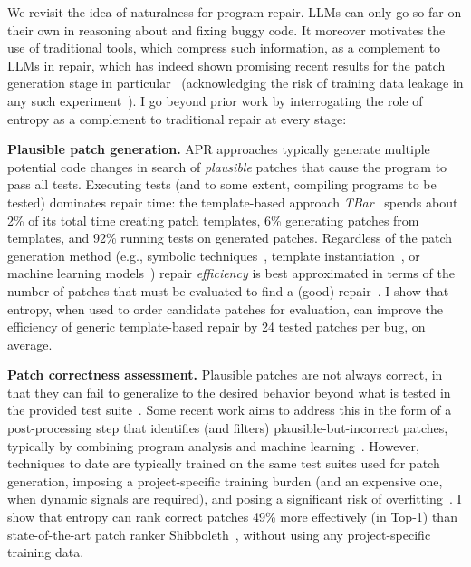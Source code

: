 \documentclass[12pt,openany,oneside,table]{cmuthesis}
\begin{document}
We revisit the idea of naturalness for program repair. 
LLMs can only go so far on their own in reasoning about and
fixing buggy code. It moreover motivates the use of traditional tools, which
compress such information, as a complement to LLMs in repair, which has indeed
shown promising recent results for the patch generation stage in
particular~\cite{xia2023automated} (acknowledging the risk of training data
leakage in any such experiment~\cite{balloccu2024leak}). 
I go beyond prior work by interrogating the role of entropy as a complement to
traditional repair at every stage:

\noindent\textbf{Plausible patch generation.} APR approaches
typically generate multiple potential code changes in search of 
\emph{plausible} patches that cause the program to pass all tests.
Executing tests (and to some extent, compiling programs to be tested) dominates
repair time: the template-based approach \textit{TBar}~\cite{TBar} spends about 2\% of
its total time creating patch templates, 6\% generating patches from templates,
and 92\% running tests on generated patches. Regardless of the patch generation method (e.g.,
symbolic techniques~\cite{patch-sim, claire_apr,angelix}, template instantiation~\cite{TBar, kim2022multi}, or
machine learning models~\cite{xia2023automated}) repair \emph{efficiency} is best
approximated in terms of the number of patches that must be evaluated to find a
(good) repair~\cite{efficiency}.
I show that entropy, when used to order candidate patches for evaluation, can
improve the efficiency of generic template-based repair by 24
tested patches per bug, on average.

\vspace{1ex} 
\noindent\textbf{Patch correctness assessment.}
Plausible patches are not always correct, in that they can fail to generalize to
the desired behavior beyond what is tested in the provided test 
suite~\cite{CURE}.  Some recent work aims to address this in the form of a 
post-processing step that identifies (and filters) plausible-but-incorrect
patches, typically by combining program analysis and machine
learning~\cite{Panther, Shibboleth, yang2023large}.  However, techniques to date
are typically trained on the same test suites used for patch generation,
imposing a project-specific training burden (and an expensive one, when dynamic
signals are required), and posing a significant risk of overfitting~\cite{CURE, yang2023large}.  
I show that entropy can rank correct patches 49\% more effectively (in Top-1) than state-of-the-art patch ranker Shibboleth~\cite{Shibboleth}, without using any project-specific training data.
\end{document}

